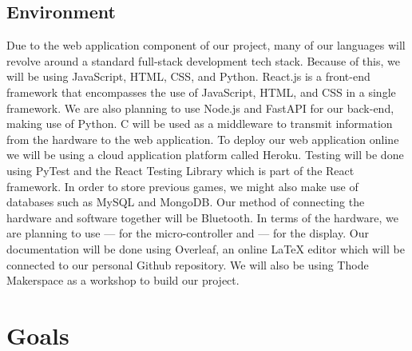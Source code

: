 \documentclass{article}
\begin{document}
\subsection{Environment}
Due to the web application component of our project, many of our languages will revolve around a standard full-stack development tech stack. Because of this, we will be using JavaScript, HTML, CSS, and Python. React.js is a front-end framework that encompasses the use of JavaScript, HTML, and CSS in a single framework. We are also planning to use Node.js and FastAPI for our back-end, making use of Python. C will be used as a middleware to transmit information from the hardware to the web application. To deploy our web application online we will be using a cloud application platform called Heroku. Testing will be done using PyTest and the React Testing Library which is part of the React framework. In order to store previous games, we might also make use of databases such as MySQL and MongoDB. Our method of connecting the hardware and software together will be Bluetooth. In terms of the hardware, we are planning to use --- for the micro-controller and --- for the display. Our documentation will be done using Overleaf, an online LaTeX editor which will be connected to our personal Github repository. We will also be using Thode Makerspace as a workshop to build our project.




\section{Goals}
\end{document}
